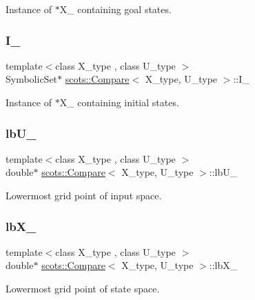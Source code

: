 Instance of $\ast$\+X\+\_\+ containing goal states. \mbox{\label{classscots_1_1Compare_a32b383c4e137a371859fdee22c165486}} 
\subsubsection{\texorpdfstring{I\+\_\+}{I\_}}
{\footnotesize\ttfamily template$<$class X\+\_\+type , class U\+\_\+type $>$ \\
Symbolic\+Set$\ast$ \hyperlink{classscots_1_1Compare}{scots\+::\+Compare}$<$ X\+\_\+type, U\+\_\+type $>$\+::I\+\_\+}

Instance of $\ast$\+X\+\_\+ containing initial states. \mbox{\label{classscots_1_1Compare_a2e5b605b24f26910ea99264de9474a33}} 
\subsubsection{\texorpdfstring{lb\+U\+\_\+}{lbU\_}}
{\footnotesize\ttfamily template$<$class X\+\_\+type , class U\+\_\+type $>$ \\
double$\ast$ \hyperlink{classscots_1_1Compare}{scots\+::\+Compare}$<$ X\+\_\+type, U\+\_\+type $>$\+::lb\+U\+\_\+}

Lowermost grid point of input space. \mbox{\label{classscots_1_1Compare_a73eb8628cb603f8e3fd914e01368c457}} 
\subsubsection{\texorpdfstring{lb\+X\+\_\+}{lbX\_}}
{\footnotesize\ttfamily template$<$class X\+\_\+type , class U\+\_\+type $>$ \\
double$\ast$ \hyperlink{classscots_1_1Compare}{scots\+::\+Compare}$<$ X\+\_\+type, U\+\_\+type $>$\+::lb\+X\+\_\+}

Lowermost grid point of state space. \mbox{\label{classscots_1_1Compare_a5dd50527db402893630c209d05be4ef0}} 
